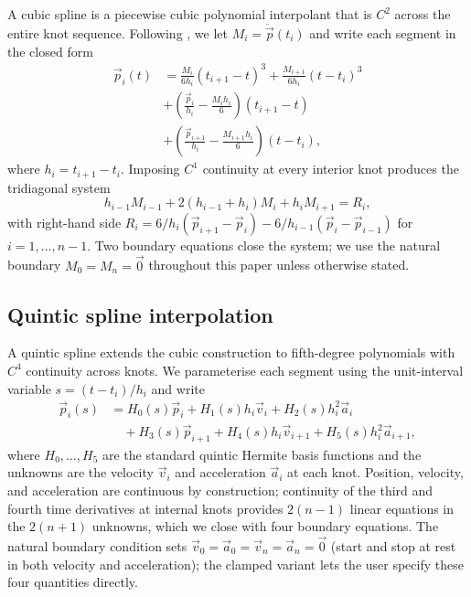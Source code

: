 A cubic spline is a piecewise cubic polynomial interpolant that is
$C^2$ across the entire knot sequence. Following \cite[Section
18.6]{chapra2021}, we let $M_i = \ddot{\vec{p}}(t_i)$ and write each
segment in the closed form
\begin{align}
\vec{p}_i(t) &= \frac{M_i}{6 h_i}(t_{i+1} - t)^3
              + \frac{M_{i+1}}{6 h_i}(t - t_i)^3 \nonumber\\
            &+ \left(\frac{\vec{p}_i}{h_i} - \frac{M_i h_i}{6}\right)(t_{i+1} - t)
              \nonumber\\
            &+ \left(\frac{\vec{p}_{i+1}}{h_i} - \frac{M_{i+1} h_i}{6}\right)(t - t_i),
\label{eq:cubic-segment}
\end{align}
where $h_i = t_{i+1} - t_i$. Imposing $C^1$ continuity at every
interior knot produces the tridiagonal system
\cite[Eq.~18.37]{chapra2021}
\begin{equation}
h_{i-1} M_{i-1} + 2(h_{i-1} + h_i) M_i + h_i M_{i+1} = R_i,
\label{eq:cubic-system}
\end{equation}
with right-hand side
$R_i = 6/h_i (\vec{p}_{i+1} - \vec{p}_i)
     - 6/h_{i-1} (\vec{p}_i - \vec{p}_{i-1})$
for $i = 1, \dots, n-1$. Two boundary equations close the system; we
use the natural boundary $M_0 = M_n = \vec{0}$ throughout this paper
unless otherwise stated.

\subsection{Quintic spline interpolation}
\label{sec:bg-quintic}

A quintic spline extends the cubic construction to fifth-degree
polynomials with $C^4$ continuity across knots. We parameterise each
segment using the unit-interval variable $s = (t - t_i)/h_i$ and
write
\begin{align}
\vec{p}_i(s) &= H_0(s) \vec{p}_i + H_1(s) h_i \vec{v}_i + H_2(s) h_i^2 \vec{a}_i \nonumber\\
           &\quad + H_3(s) \vec{p}_{i+1} + H_4(s) h_i \vec{v}_{i+1}
                 + H_5(s) h_i^2 \vec{a}_{i+1},
\label{eq:quintic-hermite}
\end{align}
where $H_0,\dots,H_5$ are the standard quintic Hermite basis functions
and the unknowns are the velocity $\vec{v}_i$ and acceleration
$\vec{a}_i$ at each knot. Position, velocity, and acceleration are
continuous by construction; continuity of the third and fourth time
derivatives at internal knots provides $2(n-1)$ linear equations in
the $2(n+1)$ unknowns, which we close with four boundary equations.
The natural boundary condition sets
$\vec{v}_0 = \vec{a}_0 = \vec{v}_n = \vec{a}_n = \vec{0}$
(start and stop at rest in both velocity and acceleration); the
clamped variant lets the user specify these four quantities directly.

